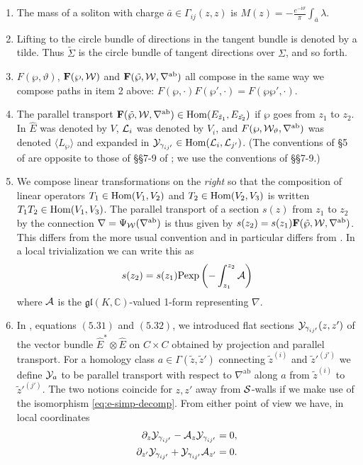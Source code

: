 \documentclass[11pt,a4paper]{article}
\def\IC{\mathbb{C}}
\def\fg{\mathfrak{g}}
\def\CL {{\cal L}}
\def\wnet {{\cal W}}
\def\CY {{\cal Y}}
\def\CS {{\cal S}}
\def\CA{{\cal A}}
\def\ab{{\mathrm{ab}}}
\def\be{\bar{e}}
\def\bF{\mathbf{F}}
\def\fg{\mathfrak{g}}
\def\IC{\mathbb{C}}
\def\CL {{\cal L}}
\def\wnet {{\cal W}}
\def\CY {{\cal Y}}
\def\CS {{\cal S}}
\def\CA{{\cal A}}
\def\be{\begin{equation}
}
\def\ee{\end{equation}}
\newcommand\I{{\mathrm i}}
\begin{document}
\begin{enumerate}
\item The mass of a soliton with charge $\bar a\in \Gamma_{ij}(z,z)$
is $M(z) = - \frac{e^{-\I \vartheta}}{\pi} \int_{\bar a} \lambda$.

\item Lifting to the circle bundle of directions in the tangent bundle is denoted by
a tilde.  Thus $\tilde \Sigma$ is the circle bundle of tangent directions over $\Sigma$, and so forth.

\item $F(\wp, \vartheta)$, $\textbf{F}(\wp,\wnet)$ and $\bF(\tilde \wp, \wnet, \nabla^\ab)$
all compose in the same way we compose paths in item 2 above:
$F(\wp, \cdot) F(\wp', \cdot) = F(\wp\wp', \cdot)$.

\item The parallel transport $\bF(\tilde \wp, \wnet, \nabla^\ab) \in {\rm Hom}(E_{\tilde z_1}, E_{\tilde{z_2}})$
if $\wp$ goes from $z_1$ to $z_2$.
In \cite{Gaiotto:2011tf}
$\hat E$ was denoted by $V$, $\CL_i$ was denoted
by $V_i$, and  $F(\wp,\wnet_\vartheta,\nabla^\ab)$ was denoted $\langle L_{\wp} \rangle$
and expanded in $\CY_{\gamma_{ij'}} \in {\rm Hom}(\CL_i, \CL_{j'})$.
(The conventions of \S 5 of \cite{Gaiotto:2011tf} are opposite to those of \S\S 7-9 of
\cite{Gaiotto:2011tf}; we use the conventions of \S\S 7-9.)

\item We compose linear transformations on the \emph{right} so that the composition
of linear operators $T_1\in {\rm Hom}(V_1,V_2)$
and $T_2 \in {\rm Hom}(V_2,V_3)$ is written $T_1 T_2\in {\rm Hom}(V_1,V_3)$.
The parallel transport of a section $s(z)$ from
$z_1$ to $z_2$ by the connection $\nabla = \Psi_\wnet(\nabla^\ab)$ is thus
given by $s(z_2) = s(z_1) \bF(\tilde \wp, \wnet, \nabla^\ab)$.
This differs from the more usual convention and in particular differs from
\cite{Gaiotto:2011tf}. In a local trivialization we can write this as
\be\label{eq:pexp-sign}
s(z_2)= s(z_1) {\rm Pexp} \left( - \int_{z_1}^{z_2} \CA \right)
\ee
where $\CA$ is the $\fg\mathfrak{l}(K,\IC)$-valued 1-form representing $\nabla$.

\item In \cite{Gaiotto:2011tf}, equations $(5.31)$ and $(5.32)$, we
introduced flat sections  $\CY_{\gamma_{ij'}}(z,z')$ of the vector
bundle $\hat E^* \otimes \hat E$ on $C \times C$ obtained by
projection and parallel transport.
For a homology class $a \in \Gamma(\tilde z,\tilde z')$ connecting $\tilde z^{(i)}$ and $\tilde z'^{(j')}$
we define $\CY_{a}$ to be parallel transport with respect to
$\nabla^\ab$ along $a$ from $\tilde z^{(i)}$ to  $\tilde z'^{(j')}$.
The two notions coincide for $z,z'$ away from $\CS$-walls if we
make use of the isomorphism \eqref{eq:e-simp-decomp}.
From either point of view we have, in local coordinates
\be
\begin{split}
\partial_z \CY_{\gamma_{ij'}} - \CA_z \CY_{\gamma_{ij'}} & = 0, \\
\partial_{z'} \CY_{\gamma_{ij'}} +   \CY_{\gamma_{ij'}} \CA_{z'} & = 0. \\
\end{split}
\ee


\end{enumerate}
\end{document}
